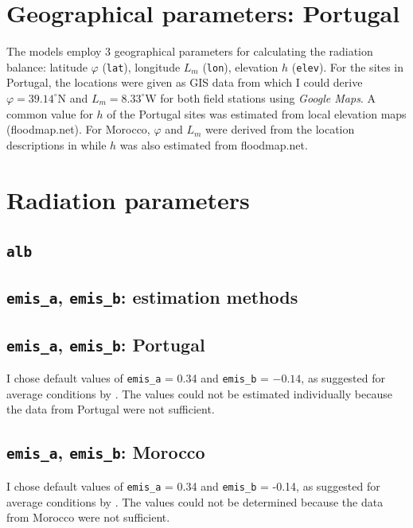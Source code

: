\documentclass{scrreprt}
\begin{document}
\section{Geographical parameters: Portugal} \label{sec:parest_geo}

The models employ 3 geographical parameters for calculating the radiation balance: latitude $\varphi$ (\verb!lat!), longitude $L_m$ (\verb!lon!), elevation $h$ (\verb!elev!). For the sites in Portugal, the locations were given as GIS data from which I could derive $\varphi = 39.14 ^\circ$N and $L_m= 8.33 ^\circ$W for both field stations using \emph{Google Maps}. A common value for $h$ of the Portugal sites was estimated from local elevation maps (floodmap.net). For Morocco, $\varphi$ and $L_m$ were derived from the location descriptions in \citet{mroos14} while $h$ was also estimated from floodmap.net.

\section{Radiation parameters} \label{sec:parest_rad}

\subsection{\texttt{alb}} \label{ssec:parest_rad_alb}

\subsection{\texttt{emis\_a}, \texttt{emis\_b}: estimation methods} \label{ssec:parest_rad_emismethods}

\subsection{\texttt{emis\_a}, \texttt{emis\_b}: Portugal} \label{ssec:parest_rad_emisportugal}

I chose default values of \verb!emis_a! = 0.34 and \verb!emis_b! = $-0.14$, as suggested for average conditions by \citet{maidment93}.
The values could not be estimated individually because the data from Portugal were not sufficient.

\subsection{\texttt{emis\_a}, \texttt{emis\_b}: Morocco} \label{ssec:parest_rad_emismorocco}

I chose default values of \verb!emis_a! = 0.34 and \verb!emis_b! = -0.14, as suggested for average conditions by \citet{maidment93}.
The values could not be determined because the data from Morocco were not sufficient.
\end{document}
